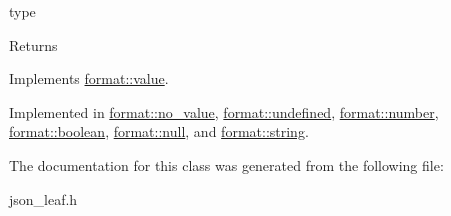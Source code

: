 type 

\begin{DoxyReturn}{Returns}

\end{DoxyReturn}


Implements \hyperlink{classformat_1_1value_a7112d0f83cf61aa9e1cdde90fc444996}{format\+::value}.



Implemented in \hyperlink{classformat_1_1no__value_a2819b3ce13265c40a74d4f11c2577bf5}{format\+::no\+\_\+value}, \hyperlink{classformat_1_1undefined_a72e4ff819514b2a4126be1969d5bbabe}{format\+::undefined}, \hyperlink{classformat_1_1number_a1934b4d3cf603de3afd5eb6329be7fba}{format\+::number}, \hyperlink{classformat_1_1boolean_a91dccd7986764af76b70627a348f27a4}{format\+::boolean}, \hyperlink{classformat_1_1null_a3878d16875e190e0f319bf6f600883c9}{format\+::null}, and \hyperlink{classformat_1_1string_a247e17aaf8cb8e0afdc29e943d492232}{format\+::string}.



The documentation for this class was generated from the following file\+:\begin{DoxyCompactItemize}
\item 
json\+\_\+leaf.\+h\end{DoxyCompactItemize}
